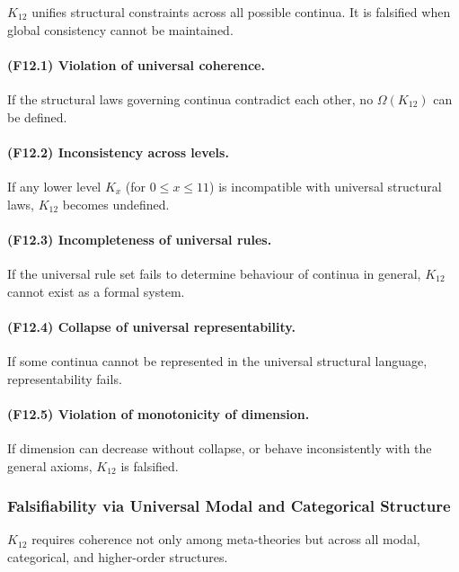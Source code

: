 $K_{12}$ unifies structural constraints across all possible continua.
It is falsified when global consistency cannot be maintained.

\paragraph{(F12.1) Violation of universal coherence.}
If the structural laws governing continua contradict each other,
no $\Omega(K_{12})$ can be defined.

\paragraph{(F12.2) Inconsistency across levels.}
If any lower level $K_x$ (for $0 \le x \le 11$) is incompatible with
universal structural laws, $K_{12}$ becomes undefined.

\paragraph{(F12.3) Incompleteness of universal rules.}
If the universal rule set fails to determine behaviour of continua
in general, $K_{12}$ cannot exist as a formal system.

\paragraph{(F12.4) Collapse of universal representability.}
If some continua cannot be represented in the universal structural
language, representability fails.

\paragraph{(F12.5) Violation of monotonicity of dimension.}
If dimension can decrease without collapse, or behave inconsistently
with the general axioms, $K_{12}$ is falsified.



\subsubsection{Falsifiability via Universal Modal and Categorical Structure}

$K_{12}$ requires coherence not only among meta-theories but across all
modal, categorical, and higher-order structures.

